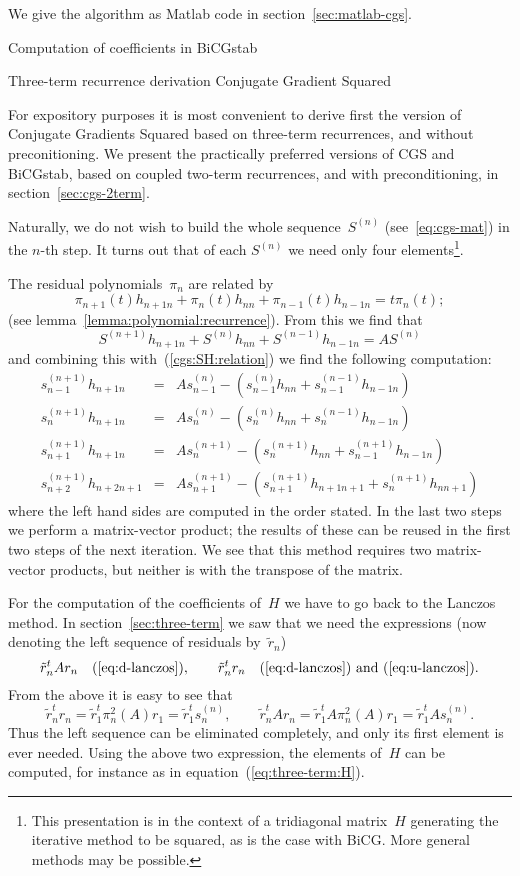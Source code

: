 We give the algorithm as Matlab code in section~\ref{sec:matlab-cgs}.

 {Computation of coefficients in BiCGstab}

 {Three-term recurrence derivation Conjugate Gradient Squared}

For expository purposes it is most convenient to derive first
the version of Conjugate Gradients Squared based on three-term
recurrences, and without preconitioning.
We present the practically preferred versions
of CGS and BiCGstab,
based on coupled two-term recurrences, and with preconditioning,
in section~\ref{sec:cgs-2term}.

Naturally, we do not wish to build the whole sequence~$S^{(n)}$ 
(see~\eqref{eq:cgs-mat})
in the $n$-th step.
It turns out that of each $S^{(n)}$ we need only four
elements\footnote{This presentation is in the context of 
a tridiagonal matrix~$H$ generating the iterative method
to be squared, as is the case with BiCG.
More general methods may be possible.}.

The residual polynomials~$\pi_n$ are related by
\begin{equation}
	\pi_{n+1}(t)h_{n+1n} + \pi_n(t)h_{nn} + \pi_{n-1}(t)h_{n-1n}
	= t \pi_n(t); 
	\label{cgs:pi:relation}\end{equation}
(see lemma~\ref{lemma:polynomial:recurrence}).
From this we find that
\[ S^{(n+1)}h_{n+1n} + S^{(n)}h_{nn} + S^{(n-1)}h_{n-1n} = AS^{(n)} \]
and combining this with~(\ref{cgs:SH:relation}) we find the following
computation:
\begin{eqnarray*}
	s^{(n+1)}_{n-1} h_{n+1n} &=& As^{(n)}_{n-1} -
		( s^{(n)}_{n-1} h_{nn} + s^{(n-1)}_{n-1} h_{n-1n} ) \\
	s^{(n+1)}_{n} h_{n+1n} &=& As^{(n)}_{n} -
		( s^{(n)}_{n} h_{nn} + s^{(n-1)}_{n} h_{n-1n} ) \\
	s^{(n+1)}_{n+1} h_{n+1n} &=& A s^{(n+1)}_{n} -
		( s^{(n+1)}_{n} h_{nn} + s^{(n+1)}_{n-1} h_{n-1n} ) \\
	s^{(n+1)}_{n+2} h_{n+2n+1} &=& A s^{(n+1)}_{n+1} -
		( s^{(n+1)}_{n+1} h_{n+1n+1} + s^{(n+1)}_{n} h_{nn+1} )
\end{eqnarray*}
where the left hand sides are computed in the order stated.
In the last two steps we perform a matrix-vector product; the
results of these can be reused in the first two steps of the next iteration.
We see that this method requires two matrix-vector products, but
neither is with the transpose of the matrix.

For the computation of the coefficients of~$H$ we have to go back to
the Lanczos method. In section~\ref{sec:three-term} we saw that we need the
expressions (now denoting the left sequence of residuals by~$\tilde
r_n$)
\[ \tilde r_n^tAr_n\quad (\ref{eq:d-lanczos}),\qquad
   \tilde r_n^tr_n\quad \hbox{(\ref{eq:d-lanczos}) 
				and (\ref{eq:u-lanczos})}. \]
From the above it is easy to see that
\[ \tilde r_n^tr_n = \tilde r_1^t\pi_n^2(A)r_1 = \tilde r_1^ts^{(n)}_n,
	\qquad
   \tilde r_n^tAr_n = \tilde r_1^tA\pi_n^2(A)r_1 =
	\tilde r_1^tAs^{(n)}_n. \]
Thus the left sequence can be eliminated completely, and only its
first element is ever needed.
Using the above two expression, the elements of~$H$ can be computed,
for instance as in equation~(\ref{eq:three-term:H}).

